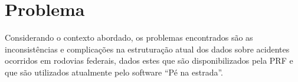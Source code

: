 \section{Problema}

Considerando o contexto abordado, os problemas encontrados são as inconsistências e
complicações na estruturação atual dos dados sobre acidentes ocorridos em rodovias
federais, dados estes que são disponibilizados pela PRF e que são utilizados atualmente
pelo software “Pé na estrada”.